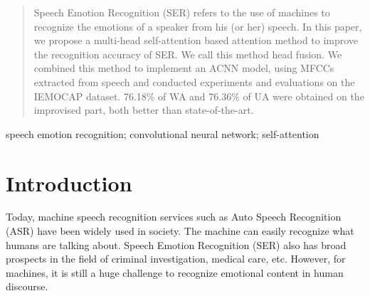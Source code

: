 \documentclass[10pt, conference, compsocconf]{IEEEtran}
\begin{document}
\begin{abstract}
Speech Emotion Recognition (SER) refers to the use of machines to recognize the emotions of a speaker from his (or her) speech. In this paper, we propose a multi-head self-attention based attention method to improve the recognition accuracy of SER. We call this method head fusion. We combined this method to implement an ACNN model, using MFCCs extracted from speech and conducted experiments and evaluations on the IEMOCAP dataset. 76.18\% of WA and 76.36\% of UA were obtained on the improvised part, both better than state-of-the-art.
\end{abstract}

\begin{IEEEkeywords}
speech emotion recognition; convolutional neural network; self-attention
\end{IEEEkeywords}


%
\IEEEpeerreviewmaketitle



\section{Introduction}
%
Today, machine speech recognition services such as Auto Speech Recognition (ASR) have been widely used in society. The machine can easily recognize what humans are talking about. Speech Emotion Recognition (SER) also has broad prospects in the field of criminal investigation, medical care, etc. However, for machines, it is still a huge challenge to recognize emotional content in human discourse.
\end{document}
